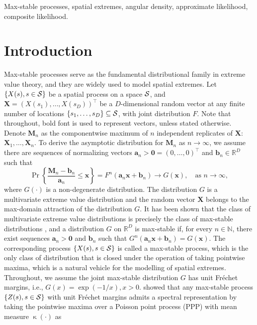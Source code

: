 \documentclass[lineno]{biometrika}
\begin{document}
\begin{keywords}
    Max-stable processes, spatial extremes, angular density, approximate likelihood, composite likelihood.
\end{keywords}

\section{Introduction}\label{sec:intro}
Max-stable processes serve as the fundamental distributional family in extreme value theory, and they are widely used to model spatial extremes. Let $\{X(s),s\in{\mathcal{S}}\}$ be a spatial process on a space ${\mathcal{S}}$, and $\bm X=(X(s_1),\dots,X(s_D))^\top$ be a $D$-dimensional random vector at any finite number of locations $\{s_1,\dots,s_D\}\subseteq{\mathcal{S}}$, with joint distribution $F$. 
Note that throughout, bold font is used to represent vectors, unless stated otherwise.  
Denote $\bm M_n$ as the componentwise maximum of $n$ independent replicates of $\bm X$: $\bm X_1, \dots, \bm X_n$. To derive the asymptotic distribution for $\bm M_n$ as $n\to\infty$, we assume there are sequences of normalizing vectors ${\bm a_n> \bm 0} = (0, \ldots, 0)^\top$ and $\bm b_n \in \mathbb{R}^D$ such that 
\begin{equation}
\label{eq:max-stable}
\Pr\left\{\frac{\bm M_n - \bm b_n  }{\bm a_n} \leq \bm x\right\} = F^n(\bm a_n\bm x + \bm b_n) \to G(\bm x), \quad \mbox{as }n\to \infty,
\end{equation}  
where $G(\cdot)$ is a non-degenerate distribution. The distribution $G$ is a multivariate extreme value distribution and the random vector $\bm X$ belongs to the max-domain attraction of the distribution $G$. It has been shown that the class of multivariate extreme value distributions is precisely the class of max-stable distributions \citep[p. 264]{Resnick1987}, and a distribution $G$ on $\mathbb R^D$ is max-stable if, for every $n\in\mathbb N$, there exist sequences $\bm a_n>\bm 0$ and $\bm b_n$ such that $G^n(\bm a_n\bm x + \bm b_n) =G(\bm x)$. The corresponding process $\{X(s),s\in{\mathcal{S}}\}$ is called a max-stable process, which is the only class of distribution that is closed under the operation of taking pointwise maxima,  which is a natural vehicle for the modelling of spatial extremes.
Throughout, we assume the joint max-stable distribution $G$ has unit Fr\'echet margins, i.e., $G(x)=\exp(-1/x), x>0$. \cite{Haan1984} showed that any max-stable process $\{Z(s),s\in{\mathcal{S}}\}$ with unit Fr\'echet margins admits a spectral representation by taking the pointwise maxima over a Poisson point process (PPP) with mean measure $\upkappa(\cdot)$ as 
\end{document}
